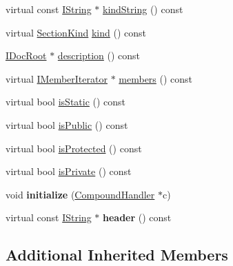 \begin{DoxyCompactItemize}
\item 
virtual const \hyperlink{class_i_string}{I\-String} $\ast$ \hyperlink{class_section_handler_a9d1b8d88b3f77b9e3326cd04cac62504}{kind\-String} () const 
\item 
virtual \hyperlink{class_i_section_a7082fb45267dee090a2ecc569f5b1c9c}{Section\-Kind} \hyperlink{class_section_handler_a7e3aadffc7b3089136879aa53c04cb5a}{kind} () const 
\item 
\hyperlink{class_i_doc_root}{I\-Doc\-Root} $\ast$ \hyperlink{class_section_handler_a82b3b70f767b9723b25005aeb6b4c335}{description} () const 
\item 
virtual \hyperlink{class_i_member_iterator}{I\-Member\-Iterator} $\ast$ \hyperlink{class_section_handler_a94b970d37313c8530611b18b37b992bc}{members} () const 
\item 
virtual bool \hyperlink{class_section_handler_ae185e7061f648b432db7a949d84571a0}{is\-Static} () const 
\item 
virtual bool \hyperlink{class_section_handler_a0a0ba391ac373fa2e8ea6af7c9ee4e77}{is\-Public} () const 
\item 
virtual bool \hyperlink{class_section_handler_a7f22afb2637680b08324f3c9da9433da}{is\-Protected} () const 
\item 
virtual bool \hyperlink{class_section_handler_a950c4be289e9abc8ac9047bf79da29ab}{is\-Private} () const 
\item 
\hypertarget{class_section_handler_afaa635698b357e5b72192c5e032fe254}{void {\bfseries initialize} (\hyperlink{class_compound_handler}{Compound\-Handler} $\ast$c)}\label{class_section_handler_afaa635698b357e5b72192c5e032fe254}

\item 
\hypertarget{class_section_handler_a6e4e7261f792aa98c98b51ef5406eba2}{virtual const \hyperlink{class_i_string}{I\-String} $\ast$ {\bfseries header} () const }\label{class_section_handler_a6e4e7261f792aa98c98b51ef5406eba2}

\end{DoxyCompactItemize}
\subsection*{Additional Inherited Members}


